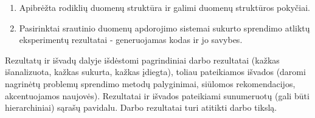 \documentclass{VUMIFPSbakalaurinis}
\begin{document}
\begin{enumerate}
    \item Apibrėžta rodiklių duomenų struktūra ir galimi duomenų struktūros pokyčiai.
    \item Pasirinktai srautinio duomenų apdorojimo sistemai sukurto sprendimo atliktų eksperimentų rezultatai - generuojamas kodas ir jo savybes. 
\end{enumerate}

Rezultatų ir išvadų dalyje išdėstomi pagrindiniai darbo rezultatai (kažkas
išanalizuota, kažkas sukurta, kažkas įdiegta), toliau pateikiamos išvados
(daromi nagrinėtų problemų sprendimo metodų palyginimai, siūlomos
rekomendacijos, akcentuojamos naujovės). Rezultatai ir išvados pateikiami
sunumeruotų (gali būti hierarchiniai) sąrašų pavidalu. Darbo rezultatai turi
atitikti darbo tikslą.

\printbibliography[heading=bibintoc] 


\appendix 
\end{document}
